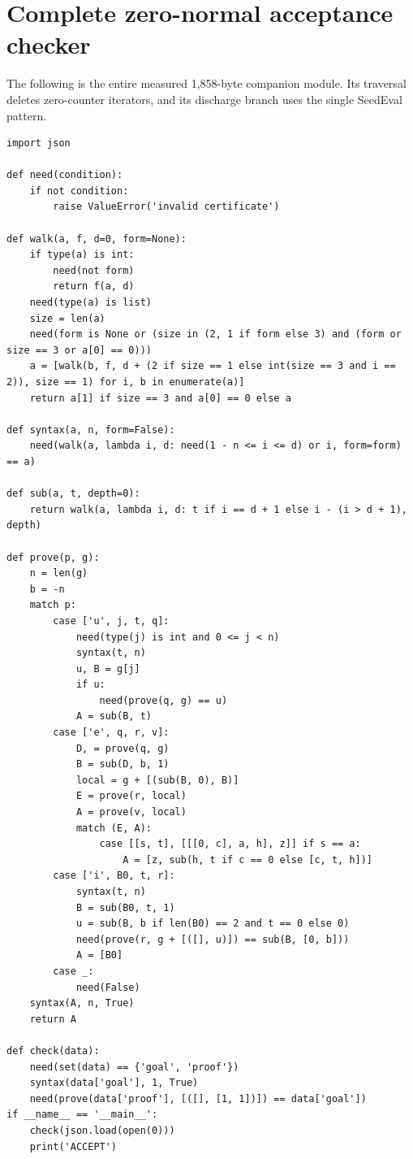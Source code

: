 \documentclass[11pt,letterpaper]{article}
\theoremstyle{definition}\newtheorem{definition}[theorem]{Definition}
\theoremstyle{remark}\newtheorem{remark}[theorem]{Remark}
\begin{document}
\section{Complete zero-normal acceptance checker}
The following is the entire measured 1,858-byte companion module. Its traversal deletes zero-counter iterators, and its discharge branch uses the single SeedEval pattern.
\begin{lstlisting}[basicstyle=\ttfamily\fontsize{7.6}{8.7}\selectfont]
import json

def need(condition):
    if not condition:
        raise ValueError('invalid certificate')

def walk(a, f, d=0, form=None):
    if type(a) is int:
        need(not form)
        return f(a, d)
    need(type(a) is list)
    size = len(a)
    need(form is None or (size in (2, 1 if form else 3) and (form or size == 3 or a[0] == 0)))
    a = [walk(b, f, d + (2 if size == 1 else int(size == 3 and i == 2)), size == 1) for i, b in enumerate(a)]
    return a[1] if size == 3 and a[0] == 0 else a

def syntax(a, n, form=False):
    need(walk(a, lambda i, d: need(1 - n <= i <= d) or i, form=form) == a)

def sub(a, t, depth=0):
    return walk(a, lambda i, d: t if i == d + 1 else i - (i > d + 1), depth)

def prove(p, g):
    n = len(g)
    b = -n
    match p:
        case ['u', j, t, q]:
            need(type(j) is int and 0 <= j < n)
            syntax(t, n)
            u, B = g[j]
            if u:
                need(prove(q, g) == u)
            A = sub(B, t)
        case ['e', q, r, v]:
            D, = prove(q, g)
            B = sub(D, b, 1)
            local = g + [(sub(B, 0), B)]
            E = prove(r, local)
            A = prove(v, local)
            match (E, A):
                case [[s, t], [[[0, c], a, h], z]] if s == a:
                    A = [z, sub(h, t if c == 0 else [c, t, h])]
        case ['i', B0, t, r]:
            syntax(t, n)
            B = sub(B0, t, 1)
            u = sub(B, b if len(B0) == 2 and t == 0 else 0)
            need(prove(r, g + [([], u)]) == sub(B, [0, b]))
            A = [B0]
        case _:
            need(False)
    syntax(A, n, True)
    return A

def check(data):
    need(set(data) == {'goal', 'proof'})
    syntax(data['goal'], 1, True)
    need(prove(data['proof'], [([], [1, 1])]) == data['goal'])
if __name__ == '__main__':
    check(json.load(open(0)))
    print('ACCEPT')
\end{lstlisting}
\clearpage
\end{document}
